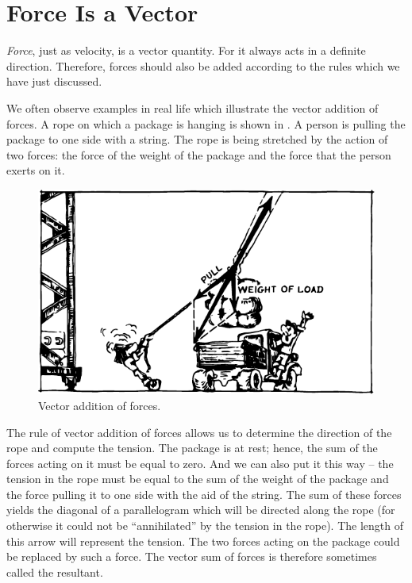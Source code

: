 \section{Force Is a Vector}
\emph{Force}, just as velocity, is a vector quantity. For it always
acts in a definite direction. Therefore, forces should also be added
according to the rules which we have just discussed.

We often observe examples in real life which illustrate the vector
addition of forces. A rope on which a package is hanging is shown in
 . A person is pulling the package to one side with a
string. The rope is being stretched by the action of two forces: the
force of the weight of the package and the force that the person
exerts on it.
\begin{figure}[!ht]
\centering
\includegraphics[width=\textwidth]{figures/fig-01-07.pdf}
\caption{Vector addition of forces.}
\label{fig-1.7}
\end{figure}
The rule of vector addition of forces allows us to determine the direction of the rope and compute the tension.
The package is at rest; hence, the sum of the forces acting
on it must be equal to zero. And we can also put it this
way -- the tension in the rope must be equal to the sum
of the weight of the package and the force pulling it to
one side with the aid of the string. The sum of these
forces yields the diagonal of a parallelogram which will
be directed along the rope (for otherwise it could not be
``annihilated'' by the tension in the rope). The length
of this arrow will represent the tension. The two forces
acting on the package could be replaced by such a force.
The vector sum of forces is therefore sometimes called
the resultant.

